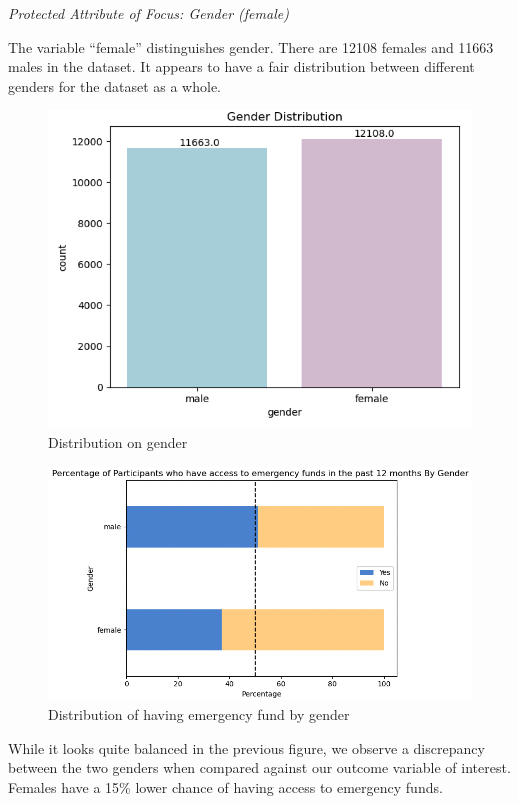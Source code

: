 \documentclass[12pt]{article}
\begin{document}
\emph{Protected Attribute of Focus: Gender (female)}

The variable ``female'' distinguishes gender. There are 12108 females
and 11663 males in the dataset. It appears to have a fair distribution
between different genders for the dataset as a whole.

\begin{figure}

{\centering \includegraphics[width=0.7\linewidth]{graphs/f24_graph2} 

}

\caption{Distribution on gender}\label{fig:unnamed-chunk-3}
\end{figure}

\begin{figure}

{\centering \includegraphics[width=0.7\linewidth]{graphs/f24_graph3} 

}

\caption{Distribution of having emergency fund by gender}\label{fig:unnamed-chunk-4}
\end{figure}

While it looks quite balanced in the previous figure, we observe a
discrepancy between the two genders when compared against our outcome
variable of interest. Females have a 15\% lower chance of having access
to emergency funds.
\end{document}
